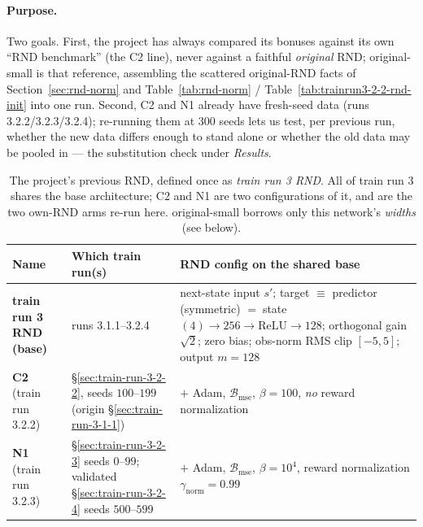 \paragraph{Purpose.}
Two goals. First, the project has always compared its bonuses against its own ``RND benchmark''
(the C2 line), never against a faithful \emph{original} RND; original-small is that reference,
assembling the scattered original-RND facts of Section~\ref{sec:rnd-norm} and
Table~\ref{tab:rnd-norm} / Table~\ref{tab:trainrun3-2-2-rnd-init} into one run. Second, C2 and N1
already have fresh-seed data (runs 3.2.2/3.2.3/3.2.4); re-running them at $300$ seeds lets us test,
per previous run, whether the new data differs enough to stand alone or whether the old data may be
pooled in --- the substitution check under \emph{Results}.

\begin{table}[H]
\centering
\footnotesize
\setlength{\tabcolsep}{5pt}
\renewcommand{\arraystretch}{1.2}
\begin{tabular}{@{}>{\raggedright\arraybackslash}p{3.0cm} >{\raggedright\arraybackslash}p{4.4cm} >{\raggedright\arraybackslash}p{6.2cm}@{}}
\toprule
\textbf{Name} & \textbf{Which train run(s)} & \textbf{RND config on the shared base} \\
\midrule
\textbf{train run 3 RND (base)} & runs 3.1.1--3.2.4 &
  next-state input $s'$; target $\equiv$ predictor (symmetric)
  $=\;$state$(4)\!\to\!256\!\to\!\mathrm{ReLU}\!\to\!128$; orthogonal gain $\sqrt2$; zero bias;
  obs-norm RMS clip $[-5,5]$; output $m{=}128$ \\
\textbf{C2} (train run 3.2.2) & \S\ref{sec:train-run-3-2-2}, seeds $100$--$199$
  (origin \S\ref{sec:train-run-3-1-1}) & $+$ Adam, $\mathcal{B}_{\mathrm{mse}}$, $\beta{=}100$,
  \emph{no} reward normalization \\
\textbf{N1} (train run 3.2.3) & \S\ref{sec:train-run-3-2-3} seeds $0$--$99$; validated
  \S\ref{sec:train-run-3-2-4} seeds $500$--$599$ & $+$ Adam, $\mathcal{B}_{\mathrm{mse}}$,
  $\beta{=}10^{4}$, reward normalization $\gamma_{\mathrm{norm}}{=}0.99$ \\
\bottomrule
\end{tabular}
\caption{The project's previous RND, defined once as \emph{train run 3 RND}. All of train run 3
shares the base architecture; C2 and N1 are two configurations of it, and are the two own-RND arms
re-run here. original-small borrows only this network's \emph{widths} (see below).}
\label{tab:trainrun5-trainrun3-rnd}
\end{table}

